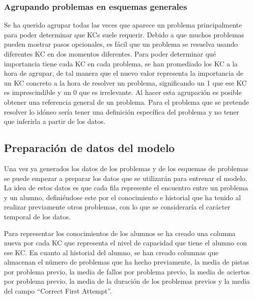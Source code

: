 \documentclass[acmtog, screen]{acmart}
\begin{document}
\subsubsection{Agrupando problemas en esquemas generales}
Se ha querido agrupar todas las veces que aparece un problema principalmente para poder determinar que KCs suele requerir. Debido a que muchos problemas pueden mostrar pasos opcionales, es fácil que un problema se resuelva usando diferentes KC en dos momentos diferentes. Para poder determinar qué importancia tiene cada KC en cada problema, se han promediado los KC a la hora de agrupar, de tal manera que el nuevo valor representa la importancia de un KC concreto a la hora de resolver un problema, significando un 1 que ese KC es imprescindible y un 0 que es irrelevante. Al hacer esta agrupación es posible obtener una referencia general de un problema. Para el problema que se pretende resolver lo idóneo sería tener una definición específica del problema y no tener que inferirla a partir de los datos.

\subsection{Preparación de datos del modelo}
Una vez ya generados los datos de los problemas y de los esquemas de problemas se puede empezar a preparar los datos que se utilizarán para entrenar el modelo. La idea de estos datos es que cada fila represente el encuentro entre un problema y un alumno, definiéndose este por el conocimiento e historial que ha tenido al realizar previamente otros problemas, con lo que se consideraría el carácter temporal de los datos.

Para representar los conocimientos de los alumnos se ha creado una columna nueva por cada KC que representa el nivel de capacidad que tiene el alumno con ese KC. En cuanto al historial del alumno, se han creado columnas que almacenan el número de problemas que ha hecho previamente, la media de pistas por problema previo, la media de fallos por problema previo, la media de aciertos por problema previo, la media de la duración de los problemas previos y la media del campo ``Correct First Attempt''.
\end{document}
